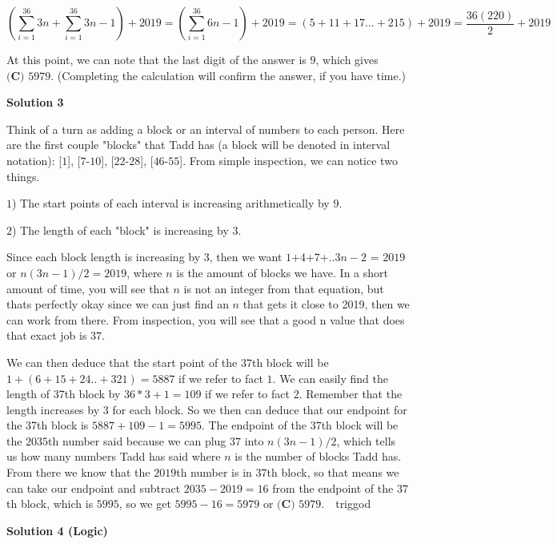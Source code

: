 \begin{enumerate}
 
 \[\left(\sum_{i=1}^{36} 3n+\sum_{i=1}^{36} 3n-1\right)+2019=\left(\sum_{i=1}^{36} 6n-1\right)+2019=(5+11+17...+215)+2019=\frac{36(220)}{2}+2019\]

 At this point, we can note that the last digit of the answer is $9$, which gives $\boxed{\textbf{(C) }5979}$. (Completing the calculation will confirm the answer, if you have time.)

 


 



\textbf{Solution 3}

Think of a turn as adding a block or an interval of numbers to each person. Here are the first couple "blocks" that Tadd has (a block will be denoted in interval notation): [$1$], [$7$-$10$], [$22$-$28$], [$46$-$55$]. From simple inspection, we can notice two things.

 $1$) The start points of each interval is increasing arithmetically by  $9$.

 $2$) The length of each "block" is increasing by $3$. 

 Since each block length is increasing by 3, then we want $1$+$4$+$7$+..$3n-2$ = $2019$ or $n(3n-1)/2 = 2019$, where $n$ is the amount of blocks we have. In a short amount of time, you will see that $n$ is not an integer from that equation, but thats perfectly okay since we can just find an $n$ that gets it close to 2019, then we can work from there. From inspection, you will see that a good n value that does that exact job is $37$. 

 We can then deduce that the start point of the $37$th block will be $1+(6+15+24..+321) = 5887$ if we refer to fact $1$. We can easily find the length of 37th block by $36*3+1 = 109$ if we refer to fact $2$. Remember that the length increases by $3$ for each block. So we then can deduce that our endpoint for the 37th block is $5887+109-1 = 5995$. The endpoint of the $37$th block will be the $2035$th number said because we can plug $37$ into $n(3n-1)/2$, which tells us how many numbers Tadd has said where $n$ is the number of blocks Tadd has. From there we know that the $2019$th number is in $37$th block, so that means we can take our endpoint and subtract $2035-2019 = 16$ from the endpoint of the $37$th block, which is $5995$, so we get $5995-16 = 5979$ or  $\boxed{\textbf{(C) }5979}$.~~triggod

 



\textbf{Solution 4 (Logic)}


\end{enumerate}
